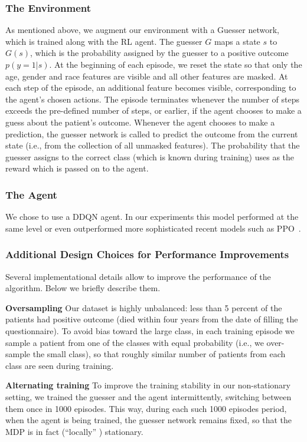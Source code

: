 \documentclass[reqno,11pt]{article}
\begin{document}
\subsubsection {The Environment}\label{sec:env}
As mentioned above, we augment our environment with a Guesser network, which is trained along with the RL agent. The guesser $G$ maps a state $s$ to $G(s)$, which is the probability assigned by the guesser to a positive outcome $p(y=1|s)$.
At the beginning of each episode, we reset the state so that only the age, gender and race features are visible and all other features are masked. 
At each step of the episode, an additional feature becomes visible, corresponding to the agent's chosen actions.
The episode terminates whenever the number of steps exceeds the pre-defined number of steps, or earlier, if the agent chooses to make a guess about the patient's outcome. Whenever the agent chooses to make a prediction,  the guesser network is called to predict the outcome from the current state (i.e., from the collection of all unmasked features). 
The probability that the guesser assigns to the correct class (which is known during training) uses as the reward which is passed on to the agent. 

\subsubsection {The Agent}\label{sec:agent}
We chose to use a DDQN agent.
In our experiments this model performed at the same level or even outperformed more sophisticated recent models such as PPO~\citep{schulman2017proximal}.

\subsubsection {Additional Design Choices for Performance Improvements}\label{sec:add}
Several implementational details allow to improve the performance of the algorithm. Below we briefly describe them.

\noindent \textbf{Oversampling}
Our dataset is highly unbalanced: less than 5 percent of the patients had positive outcome (died within four years from the date of filling the questionnaire).
To avoid bias toward the large class, in each training episode we sample a patient from one of the classes with equal probability (i.e., we over-sample the small class), so that roughly similar number of patients from each class are seen during training. 

\noindent \textbf{Alternating training}
To improve the training stability in our non-stationary setting, we trained the guesser and the agent intermittently, switching between them once in 1000 episodes. This way, during each such 1000 episodes period, when the agent is being trained, the guesser network remains fixed, so that the MDP is in fact (``locally'' ) stationary. 
\end{document}
